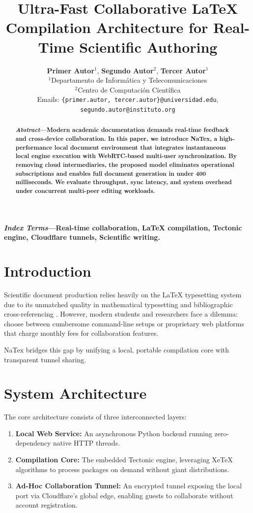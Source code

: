 \documentclass[10pt, twocolumn, letterpaper]{article}
\title{\Huge \bfseries Ultra-Fast Collaborative LaTeX Compilation Architecture for Real-Time Scientific Authoring}
\author{
  \textbf{Primer Autor}$^1$, \textbf{Segundo Autor}$^2$, \textbf{Tercer Autor}$^1$ \\
  $^1$Departamento de Informática y Telecomunicaciones \\
  $^2$Centro de Computación Científica \\
  Emails: \texttt{\{primer.autor, tercer.autor\}@universidad.edu}, \texttt{segundo.autor@instituto.org}
}
\date{}
\begin{document}
\maketitle

\begin{abstract}
\textbf{\textit{Abstract}---Modern academic documentation demands real-time feedback and cross-device collaboration. In this paper, we introduce NaTex, a high-performance local document environment that integrates instantaneous local engine execution with WebRTC-based multi-user synchronization. By removing cloud intermediaries, the proposed model eliminates operational subscriptions and enables full document generation in under 400 milliseconds. We evaluate throughput, sync latency, and system overhead under concurrent multi-peer editing workloads.}
\end{abstract}

\vspace{0.15cm}
\noindent \textbf{\textit{Index Terms}---Real-time collaboration, LaTeX compilation, Tectonic engine, Cloudflare tunnels, Scientific writing.}

\section{Introduction}
Scientific document production relies heavily on the LaTeX typesetting system due to its unmatched quality in mathematical typesetting and bibliographic cross-referencing \cite{knuth84}. However, modern students and researchers face a dilemma: choose between cumbersome command-line setups or proprietary web platforms that charge monthly fees for collaboration features.

NaTex bridges this gap by unifying a local, portable compilation core with transparent tunnel sharing.

\section{System Architecture}
The core architecture consists of three interconnected layers:
\begin{enumerate}
  \item \textbf{Local Web Service:} An asynchronous Python backend running zero-dependency native HTTP threads.
  \item \textbf{Compilation Core:} The embedded Tectonic engine, leveraging XeTeX algorithms to process packages on demand without giant distributions.
  \item \textbf{Ad-Hoc Collaboration Tunnel:} An encrypted tunnel exposing the local port via Cloudflare's global edge, enabling guests to collaborate without account registration.
\end{enumerate}
\end{document}
